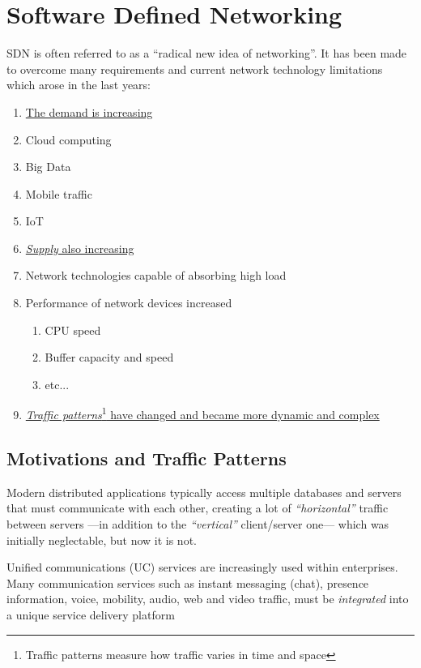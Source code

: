 \chapter{Software Defined Networking}

SDN is often referred to as a ``radical new idea of networking''. It has been made to overcome many requirements and current network technology limitations which arose in the last years:
\begin{enumerate}
   \item[] \ul{The demand is increasing}
   \item Cloud computing
   \item Big Data
   \item Mobile traffic
   \item IoT
   \item[] \ul{\textit{Supply} also increasing}
   \item Network technologies capable of absorbing high load
   \item Performance of network devices increased
   \begin{enumerate}
      \item CPU speed
      \item Buffer capacity and speed
      \item etc...
   \end{enumerate}
   \item[] \ul{\textit{Traffic patterns}\footnote{Traffic patterns measure how traffic varies in time and space} have changed and became more dynamic and complex} 
\end{enumerate}

\section{Motivations and Traffic Patterns}
Modern distributed applications typically access multiple databases and servers that
must communicate with each other, creating a lot of
\textit{``horizontal''} traffic between servers ---in addition to the \textit{``vertical''} client/server one--- which was initially neglectable, but now it is not.

Unified communications (UC) services are increasingly used within enterprises. Many communication services such as instant messaging (chat), presence
information, voice, mobility, audio, web and video traffic, must be \textit{integrated} into a unique service
delivery platform

